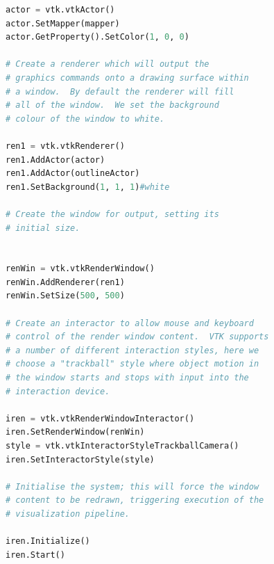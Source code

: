 \documentclass[11pt]{scrartcl}
\begin{document}
\begin{lstlisting}[language=Python]
actor = vtk.vtkActor()
actor.SetMapper(mapper)
actor.GetProperty().SetColor(1, 0, 0)

# Create a renderer which will output the
# graphics commands onto a drawing surface within
# a window.  By default the renderer will fill
# all of the window.  We set the background
# colour of the window to white.

ren1 = vtk.vtkRenderer()
ren1.AddActor(actor)
ren1.AddActor(outlineActor)
ren1.SetBackground(1, 1, 1)#white

# Create the window for output, setting its
# initial size.


renWin = vtk.vtkRenderWindow()
renWin.AddRenderer(ren1)
renWin.SetSize(500, 500)

# Create an interactor to allow mouse and keyboard
# control of the render window content.  VTK supports
# a number of different interaction styles, here we
# choose a "trackball" style where object motion in
# the window starts and stops with input into the
# interaction device.

iren = vtk.vtkRenderWindowInteractor()
iren.SetRenderWindow(renWin)
style = vtk.vtkInteractorStyleTrackballCamera()
iren.SetInteractorStyle(style)

# Initialise the system; this will force the window
# content to be redrawn, triggering execution of the
# visualization pipeline.

iren.Initialize()
iren.Start()
\end{lstlisting}
\end{document}
